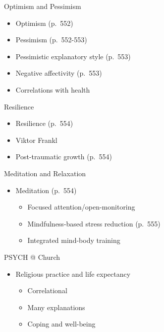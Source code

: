 \documentclass[
]{book}
\providecommand{\tightlist}{%
  \setlength{\itemsep}{0pt}\setlength{\parskip}{0pt}}
\begin{document}
\begin{reflect}
Optimism and Pessimism

\begin{itemize}
\tightlist
\item
  Optimism (p.~552)\\
\item
  Pessimism (p.~552-553)\\
\item
  Pessimistic explanatory style (p.~553)\\
\item
  Negative affectivity (p.~553)\\
\item
  Correlations with health
\end{itemize}

Resilience

\begin{itemize}
\tightlist
\item
  Resilience (p.~554)\\
\item
  Viktor Frankl\\
\item
  Post-traumatic growth (p.~554)
\end{itemize}

Meditation and Relaxation

\begin{itemize}
\tightlist
\item
  Meditation (p.~554)

  \begin{itemize}
  \tightlist
  \item
    Focused attention/open-monitoring\\
  \item
    Mindfulness-based stress reduction (p.~555)\\
  \item
    Integrated mind-body training
  \end{itemize}
\end{itemize}

PSYCH @ Church

\begin{itemize}
\tightlist
\item
  Religious practice and life expectancy

  \begin{itemize}
  \tightlist
  \item
    Correlational\\
  \item
    Many explanations\\
  \item
    Coping and well-being
  \end{itemize}
\end{itemize}


\end{reflect}
\end{document}
